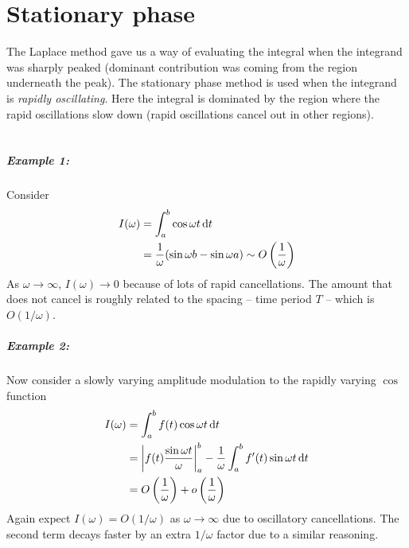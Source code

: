 \chapter{Stationary phase}
The Laplace method gave us a way of evaluating the integral when the integrand was sharply peaked (dominant contribution was coming from the region underneath the peak). The stationary phase method is used when the integrand is \emph{rapidly oscillating}. Here the integral is dominated by the region where the rapid oscillations slow down (rapid oscillations cancel out in other regions).\\
\ \newline
\paragraph{Example 1:} Consider
\begin{align*}
	I(\omega) &= \int_{a}^{b} \cos \omega t \, \mathrm{d} t \\
	&= \frac{1}{\omega}(\sin \omega b - \sin \omega a ) \sim O\left(\frac{1}{\omega }\right)
\end{align*}
As $\omega \rightarrow \infty$, $I(\omega) \rightarrow 0$ because of lots of rapid cancellations. The amount that does not cancel is roughly related to the spacing -- time period $T$ -- which is $O(1/\omega)$.

\paragraph{Example 2:} Now consider a slowly varying amplitude modulation to the rapidly varying $\cos$ function
\begin{align*}
	I(\omega) &= \int_{a}^{b} f(t) \cos \omega t \, \mathrm{d} t \\
	&= \left| f(t) \frac{\sin \omega t}{\omega} \right|^b_a - \frac{1}{\omega }\int_{a}^{b} f'(t) \sin \omega t \, \mathrm{d} t \\
	& = O\left(\frac{1}{\omega}\right) + o\left(\frac{1}{\omega}\right)
\end{align*}
Again expect $I(\omega) = O(1/\omega)$ as $\omega \rightarrow \infty$ due to oscillatory cancellations. The second term decays faster by an extra $1/\omega$ factor due to a similar reasoning.


